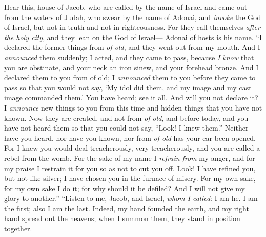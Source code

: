\begin{biblechapter} %
 Hear this, house of Jacob, 
who are called by the name of Israel 
and came out from the waters of Judah, 
who swear by the name of Adonai, 
and \textit{invoke} the God of Israel, 
but not in truth 
and not in righteousness.
\verse For they call themselves \textit{after the holy city}, 
and they lean on the God of Israel— 
Adonai of hosts is his name.
\verse “I declared the former things from \textit{of old}, 
and they went out from my mouth. 
And I \textit{announced} them suddenly; 
I acted, and they came to pass,
\verse because \textit{I know} that you are obstinate, 
and your neck an iron sinew, 
and your forehead bronze.
\verse And I declared them to you from of old; 
I \textit{ announced} them to you before they came to pass 
so that you would not say, ‘My idol did them, 
and my image and my cast image commanded them.’
\verse You have heard; see it all. 
And will you not declare it? 
I \textit{announce} new things to you from this time 
and hidden things that you have not known.
\verse Now they are created, and not from \textit{of old}, 
and before today, and you have not heard them 
so that you could not say, “Look! I knew them.”
\verse Neither have you heard, nor have you known, 
nor from \textit{of old} has your ear been opened. 
For I knew you would deal treacherously, very treacherously, 
and you are called a rebel from the womb.
\verse For the sake of my name I \textit{refrain from} my anger, 
and for my praise I restrain it for you 
so as not to cut you off.
\verse Look! I have refined you, but not like silver; 
I have chosen you in the furnace of misery.
\verse For my own sake, for my own sake I do it; 
for why should it be defiled? 
And I will not give my glory to another.”
 “Listen to me, Jacob, 
and Israel, \textit{whom I called}: 
I am he. I am the first; 
also I am the last.
\verse Indeed, my hand founded the earth, 
and my right hand spread out the heavens; 
when I summon them, they stand in position together.

\end{biblechapter}

